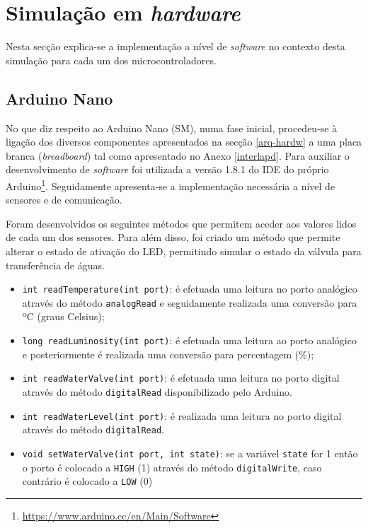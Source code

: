 






\newpage

\section{Simulação em \textit{hardware}}

Nesta secção explica-se a implementação a nível de \textit{software} no contexto desta simulação para cada um dos microcontroladores. 


\subsection{Arduino Nano}
\label{arduinonanoard}

No que diz respeito ao Arduino Nano (\acl{SM}), numa fase inicial,  procedeu-se à ligação dos diversos componentes  apresentados na secção \ref{arq-hardw} a uma placa branca (\textit{breadboard}) tal como apresentado no Anexo \ref{interlapd}. Para auxiliar o desenvolvimento de \textit{software} foi utilizada a versão 1.8.1 do \ac{IDE} do próprio Arduino\footnote{\url{https://www.arduino.cc/en/Main/Software}}. Seguidamente apresenta-se a implementação necessária a nível de sensores e de comunicação. 


Foram desenvolvidos os seguintes métodos que permitem aceder aos valores lidos de cada um dos sensores. Para além disso, foi criado um método que permite alterar o estado de ativação do \ac{LED}, permitindo simular o estado da válvula para transferência de águas. 

\begin{itemize}
	\item \texttt{int readTemperature(int port)}: é efetuada uma leitura no porto analógico através do método \texttt{analogRead} e seguidamente realizada uma conversão para ºC (graus Celsius);
	
	\item \texttt{long readLuminosity(int port)}: é efetuada uma leitura ao porto analógico e posteriormente é realizada uma conversão para percentagem (\%); 
	
	\item \texttt{int readWaterValve(int port)}: é efetuada uma leitura no porto digital através do método \texttt{digitalRead} disponibilizado pelo Arduino.
	
	\item \texttt{int readWaterLevel(int port)}: é realizada uma leitura no porto digital através do método \texttt{digitalRead}.
	
	
	\item \texttt{void setWaterValve(int port, int state)}: se a variável \texttt{state} for 1 então o porto é colocado a \texttt{HIGH} (1) através do método \texttt{digitalWrite}, caso contrário é colocado a \texttt{LOW} (0)
	
\end{itemize}

